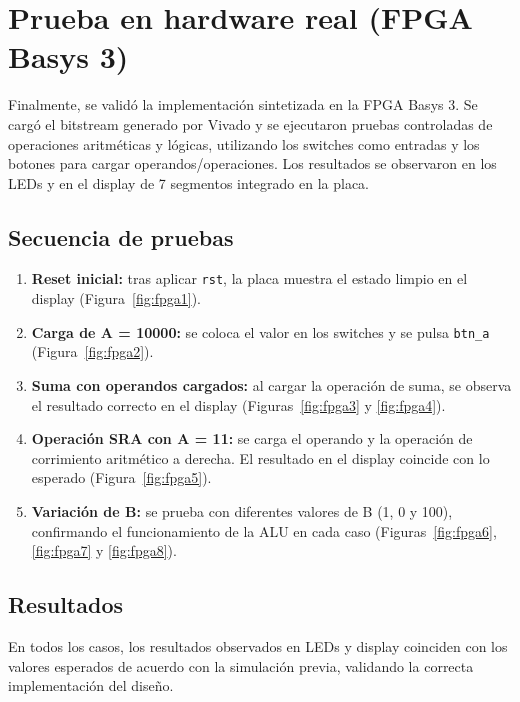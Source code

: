 \section{Prueba en hardware real (FPGA Basys 3)}

Finalmente, se validó la implementación sintetizada en la FPGA Basys 3. Se cargó el bitstream generado por Vivado y se ejecutaron pruebas controladas de operaciones aritméticas y lógicas, utilizando los switches como entradas y los botones para cargar operandos/operaciones. Los resultados se observaron en los LEDs y en el display de 7 segmentos integrado en la placa.

\subsection{Secuencia de pruebas}

\begin{enumerate}
    \item \textbf{Reset inicial:} tras aplicar \texttt{rst}, la placa muestra el estado limpio en el display (Figura~\ref{fig:fpga1}).

    \item \textbf{Carga de A = 10000:} se coloca el valor en los switches y se pulsa \texttt{btn\_a} (Figura~\ref{fig:fpga2}).

    \item \textbf{Suma con operandos cargados:} al cargar la operación de suma, se observa el resultado correcto en el display (Figuras~\ref{fig:fpga3} y \ref{fig:fpga4}).

    \item \textbf{Operación SRA con A = 11:} se carga el operando y la operación de corrimiento aritmético a derecha. El resultado en el display coincide con lo esperado (Figura~\ref{fig:fpga5}).

    \item \textbf{Variación de B:} se prueba con diferentes valores de B (1, 0 y 100), confirmando el funcionamiento de la ALU en cada caso (Figuras~\ref{fig:fpga6}, \ref{fig:fpga7} y \ref{fig:fpga8}).
\end{enumerate}

\subsection{Resultados}
En todos los casos, los resultados observados en LEDs y display coinciden con los valores esperados de acuerdo con la simulación previa, validando la correcta implementación del diseño.

